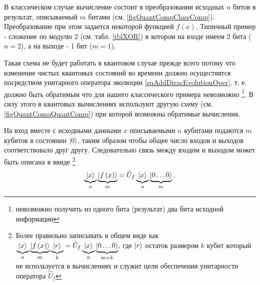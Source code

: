 

В классическом случае вычисление состоит в преобразовании исходных $n$
битов в результат, описываемый $m$ битами
(см. \autoref{figQuantCompClassComp}). Преобразование при этом
задается некоторой функцией $f\left(x\right)$. Типичный пример -
сложение по модулю 2 (см. табл. \ref {tblXOR}) в котором на входе имеем 2 бита
($n = 2$), а на выходе - 1 бит ($m = 1$).



Такая схема не будет работать в квантовом случае прежде всего потому
что изменение чистых квантовых состояний во времени должно
осуществятся посредством унитарного оператора эволюции
\eqref{eqAddDiracEvolutionOper}, т. е. должно быть обратимым что для
нашего классического примера невозможно \footnote{невозможно получить
  из одного бита (результат) два бита исходной информации}. В силу
этого в квантовых вычислениях  используют другую схему
(см. \autoref{figQuantCompQuantComp}) при которой возможны обратимые
вычисления.  

На вход вместе с исходными данными $x$ описываемыми $n$ кубитами
подаются $m$ кубитов в состоянии $\ket{0}$, таким
образом чтобы общее число входов и выходов соответствовало друг
другу. Следовательно связь между входом и выходом может быть описана в
ввиде
\footnote{Более правильно записывать в общем виде как 
$
\underbrace{\ket{x}}_n
\underbrace{\left|f\left(x\right)\right>}_m
\underbrace{\ket{r}}_k = 
\hat{U}_f \underbrace{\ket{x}}_n
\underbrace{\left|0 \dots 0\right>}_{m+k},
$
где $\ket{r}$ остаток размером $k$ кубит который не
используется в вычислениях и служит цели обеспечения унитарности
оператора $\hat{U}_f$
}
\begin{equation}
\underbrace{\ket{x}}_n
\underbrace{\left|f\left(x\right)\right>}_m = 
\hat{U}_f \underbrace{\ket{x}}_n\underbrace{\left|0 \dots
  0\right>}_m.
\label{eqQuantCompQuantComp}
\end{equation}

